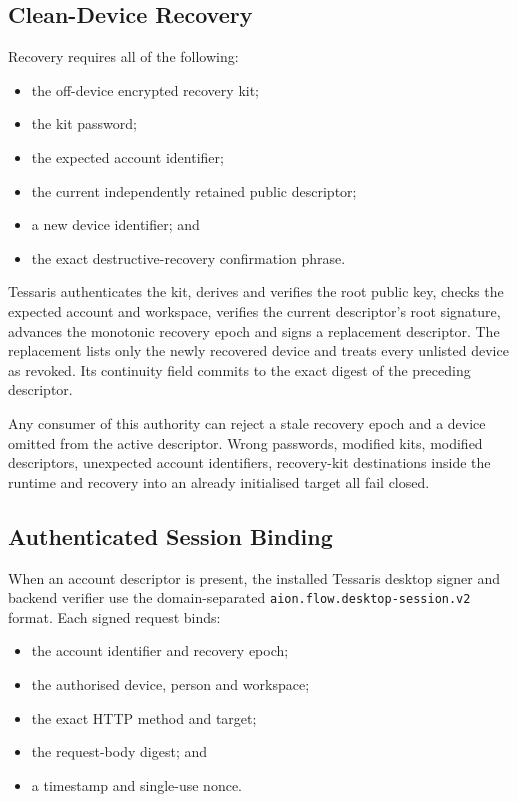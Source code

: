 \subsection{Clean-Device Recovery}

Recovery requires all of the following:

\begin{itemize}[leftmargin=*]
  \item the off-device encrypted recovery kit;
  \item the kit password;
  \item the expected account identifier;
  \item the current independently retained public descriptor;
  \item a new device identifier; and
  \item the exact destructive-recovery confirmation phrase.
\end{itemize}

Tessaris authenticates the kit, derives and verifies the root public key,
checks the expected account and workspace, verifies the current descriptor's
root signature, advances the monotonic recovery epoch and signs a replacement
descriptor.  The replacement lists only the newly recovered device and treats
every unlisted device as revoked.  Its continuity field commits to the exact
digest of the preceding descriptor.

Any consumer of this authority can reject a stale recovery epoch and a device
omitted from the active descriptor.  Wrong passwords, modified kits, modified
descriptors, unexpected account identifiers, recovery-kit destinations inside
the runtime and recovery into an already initialised target all fail closed.

\subsection{Authenticated Session Binding}

When an account descriptor is present, the installed Tessaris desktop signer
and backend verifier use the domain-separated
\texttt{aion.flow.desktop-session.v2} format.  Each signed request binds:

\begin{itemize}[leftmargin=*]
  \item the account identifier and recovery epoch;
  \item the authorised device, person and workspace;
  \item the exact HTTP method and target;
  \item the request-body digest; and
  \item a timestamp and single-use nonce.
\end{itemize}

